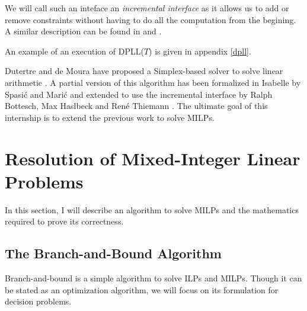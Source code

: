 \documentclass{article}
\begin{document}
We will call such an inteface an \textit{incremental interface} as it allows us
to add or remove constraints without having to do all the computation from the
begining. A similar description can be found in \cite{Dutertre2006} and
\cite{Thiemann2018,BHT2019}.

An example of an execution of DPLL($T$) is given in appendix \ref{dpll}.

Dutertre and de Moura have proposed a Simplex-based solver to solve linear
arithmetic \cite{Dutertre2006}. A partial version of this algorithm has been
formalized in Isabelle by Spasić and Marić \cite{Spasic2012} and extended to
use the incremental interface by Ralph Bottesch, Max Haslbeck and René Thiemann
\cite{Thiemann2018,BHT2019}. The ultimate goal of this internship is to extend the
previous work to solve MILPs.

\section{Resolution of Mixed-Integer Linear Problems}
In this section, I will describe an algorithm to solve MILPs and the mathematics
required to prove its correctness.

\subsection{The Branch-and-Bound Algorithm}
\label{bbdescr}
Branch-and-bound is a simple algorithm to solve ILPs and MILPs. Though it can
be stated as an optimization algorithm, we will focus on its formulation for
decision problems.
\end{document}
